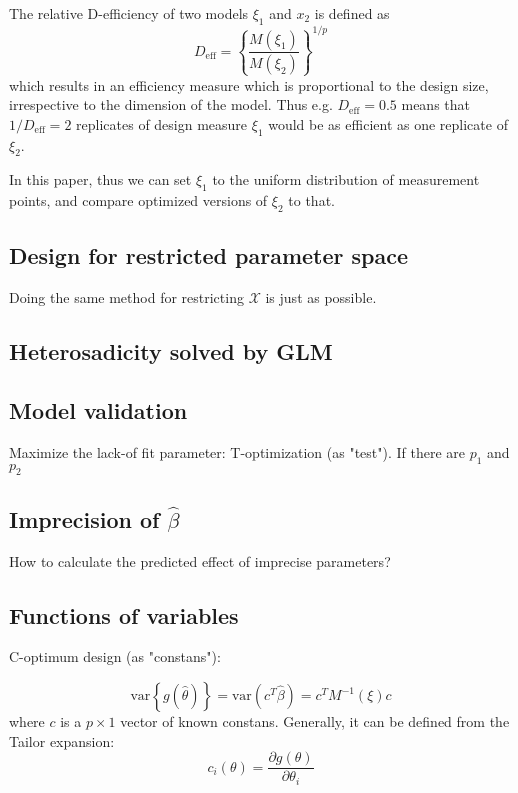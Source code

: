 \documentclass[12pt]{iopart}
\begin{document}
The relative D-efficiency of two models $\xi_1$ and $x_2$ is defined as 
\begin{equation}
D_\mathrm{eff} = \left\{\frac{M(\xi_1)}{M(\xi_2)}\right\}^{1/p}
\end{equation}
which results in an efficiency measure which is proportional to the design size, irrespective to the dimension of the model. Thus e.g. $D_\mathrm{eff} = 0.5$ means that $1 / D_\mathrm{eff} = 2$ replicates of design measure $\xi_1$ would be as efficient as one replicate of $\xi_2$.

In this paper, thus we can set $\xi_1$ to the uniform distribution of measurement points, and compare optimized versions of $\xi_2$ to that.

\subsection{Design for restricted parameter space}

Doing the same method for restricting $\mathcal{X}$ is just as possible. 

\subsection{Heterosadicity solved by GLM}
\subsection{Model validation}

Maximize the lack-of fit parameter: T-optimization (as "test"). If there are $p_1$ and $p_2$ 

\subsection{Imprecision of $\hat \beta$}

How to calculate the predicted effect of imprecise parameters?

\subsection{Functions of variables}

C-optimum design (as "constans"):

\begin{equation}
\mathrm{var}\left\{g(\hat \theta)\right\} = \mathrm{var}(c^T \hat \beta) = c^T M^{-1}(\xi) c
\end{equation}
where $c$ is a $p \times 1$ vector of known constans. Generally, it can be defined from the Tailor expansion:
\begin{equation}
c_i(\theta) = \frac{\partial g(\theta)}{\partial \theta_i}
\end{equation}
\end{document}
